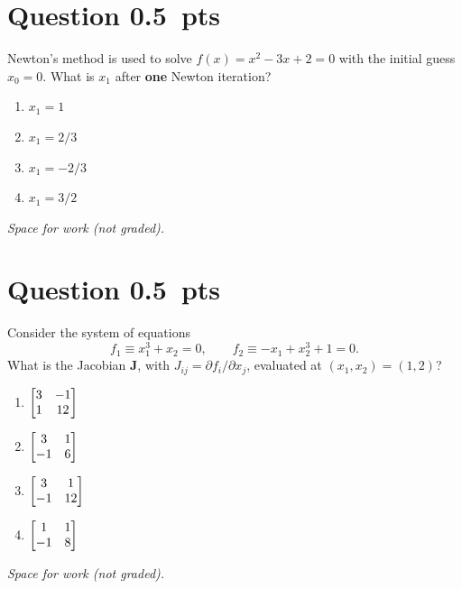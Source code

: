 \documentclass[letterpaper,11pt]{article}
\newcounter{qnum}
\newcommand{\qpts}{0.5}
\newcommand{\mcq}[5]{%
  \clearpage
  \stepcounter{qnum}%
  \section*{Question \theqnum \hfill \normalsize \qpts~pts}
  #1
  \begin{enumerate}[label=(\alph*)]
    \item #2
    \item #3
    \item #4
    \item #5
  \end{enumerate}
  \vspace{3mm}

  \textit{Space for work (not graded).}
}
\begin{document}


\newcommand{\twistsetup}{A discrete rod has three nodes, $\mathbf{x}_0 = [0, 0, 0]$, $\mathbf{x}_1 = [1, 0, 0]$, and $\mathbf{x}_2 = [1, 1, 0]$ (in meters), and two edges, $\mathbf{e}^0 = \mathbf{x}_1 - \mathbf{x}_0$ and $\mathbf{e}^1 = \mathbf{x}_2 - \mathbf{x}_1$. The material frames on the two edges are
\[
\mathbf{m}^0_1 = [0, 0, 1], \; \mathbf{m}^0_2 = [0, -1, 0] \;\; \text{on } \mathbf{e}^0, \qquad
\mathbf{m}^1_1 = [1, 0, 0], \; \mathbf{m}^1_2 = [0, 0, -1] \;\; \text{on } \mathbf{e}^1.
\]\ignorespaces}
\newcommand{\refsetup}{The (time-parallel) reference frames on the two edges are
\[
\mathbf{a}^0_1 = [0, 0, 1], \; \mathbf{a}^0_2 = [0, -1, 0] \;\; \text{on } \mathbf{e}^0, \qquad
\mathbf{a}^1_1 = \tfrac{1}{\sqrt{2}} [1, 0, 1], \; \mathbf{a}^1_2 = \tfrac{1}{\sqrt{2}} [1, 0, -1] \;\; \text{on } \mathbf{e}^1.
\]\ignorespaces}
\newcommand{\rodsetup}{A discrete rod has three nodes, $\mathbf{x}_0 = [0, 0, 0]$, $\mathbf{x}_1 = [2, 0, 0]$, and $\mathbf{x}_2 = [2, 3, 0]$ (in meters). Both edges have undeformed length $2$~m, and the rod is naturally straight ($\boldsymbol{\kappa}^0 = \mathbf{0}$). The material frames are
\[
\mathbf{m}^0_1 = [0, 1, 0], \; \mathbf{m}^0_2 = [0, 0, 1] \;\; \text{on } \mathbf{e}^0, \qquad
\mathbf{m}^1_1 = [-1, 0, 0], \; \mathbf{m}^1_2 = [0, 0, 1] \;\; \text{on } \mathbf{e}^1.
\]
The stiffnesses are $EA = 4$~N, $EI = 1$~N$\cdot$m$^2$, and $GJ = 1$~N$\cdot$m$^2$.\space}

%
%
\mcq{Newton's method is used to solve $f(x) = x^2 - 3x + 2 = 0$ with the initial guess $x_0 = 0$. What is $x_1$ after \textbf{one} Newton iteration?}
  {$x_1 = 1$}
  {$x_1 = 2/3$}
  {$x_1 = -2/3$}
  {$x_1 = 3/2$}

%
%
\mcq{Consider the system of equations
\[
f_1 \equiv x_1^3 + x_2 = 0, \qquad f_2 \equiv -x_1 + x_2^3 + 1 = 0.
\]
What is the Jacobian $\mathbf{J}$, with $J_{ij} = \partial f_i / \partial x_j$, evaluated at $(x_1, x_2) = (1, 2)$?}
  {$\mqty[3 & -1 \\ 1 & 12]$}
  {$\mqty[3 & 1 \\ -1 & 6]$}
  {$\mqty[3 & 1 \\ -1 & 12]$}
  {$\mqty[1 & 1 \\ -1 & 8]$}
\end{document}
